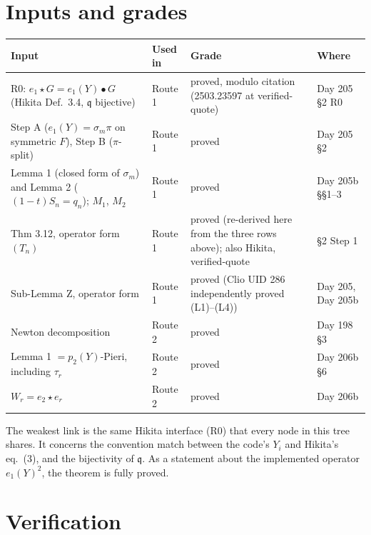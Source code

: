 \documentclass[11pt]{amsart}
\theoremstyle{remark}
\newcommand{\qq}{\mathfrak{q}}
\newcommand{\st}{\star}
\begin{document}
\section{Inputs and grades}\label{sec:grades}

{\small
\begin{center}
\renewcommand{\arraystretch}{1.25}
\begin{tabular}{@{}p{4.6cm}p{1.3cm}p{5.2cm}p{3.0cm}@{}}
\toprule
Input & Used in & Grade & Where\\
\midrule
R0: $e_1\st G=e_1(Y)\bullet G$ (Hikita Def.~3.4, $\qq$ bijective) & Route 1 & proved, modulo citation (2503.23597 at verified-quote) & Day 205 \S2 R0\\
Step A ($e_1(Y)=\sigma_m\pi$ on symmetric $F$), Step B ($\pi$-split) & Route 1 & proved & Day 205 \S2\\
Lemma 1 (closed form of $\sigma_m$) and Lemma 2 ($(1-t)S_n=q_n$); $M_1$, $M_2$ & Route 1 & proved & Day 205b \S\S1--3\\
Thm 3.12, operator form $(T_n)$ & Route 1 & proved (re-derived here from the three rows above); also Hikita, verified-quote & \S2 Step 1\\
Sub-Lemma Z, operator form & Route 1 & proved (Clio UID 286 independently proved (L1)--(L4)) & Day 205, Day 205b\\
Newton decomposition & Route 2 & proved & Day 198 \S3\\
Lemma 1 $=p_2(Y)$-Pieri, including $\tau_r$ & Route 2 & proved & Day 206b \S6\\
$W_r=e_2\st e_r$ & Route 2 & proved & Day 206b\\
\bottomrule
\end{tabular}
\end{center}
}

The weakest link is the same Hikita interface (R0) that every node in this tree shares. It concerns the convention match between the code's $Y_i$ and Hikita's eq.~(3), and the bijectivity of $\qq$. As a statement about the implemented operator $e_1(Y)^2$, the theorem is fully proved.

\section{Verification}\label{sec:verification}
\end{document}
